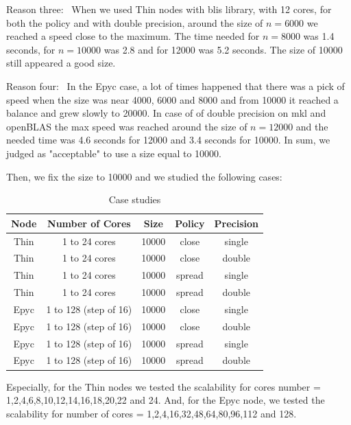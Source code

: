 \documentclass{article}
\begin{document}
Reason three: \
When we used Thin nodes with blis library, with 12 cores, for both the policy and with double precision, around the size of $ n = 6000 $ we reached a speed close to the maximum. The time needed for $ n = 8000 $ was 1.4 seconds, for $ n = 10000 $ was 2.8 and for 12000 was 5.2 seconds. The size of 10000 still appeared a good size. 

Reason four: \
In the Epyc case, a lot of times happened that there was a pick of speed when the size was near 4000, 6000 and 8000 and from 10000 it reached a balance and grew slowly to 20000. In case of of double precision on mkl and openBLAS the max speed was reached around the size of $n = 12000 $ and the needed time was 4.6 seconds for 12000 and 3.4 seconds for 10000. In sum, we judged as "acceptable" to use a size equal to 10000.

Then, we fix the size to 10000 and we studied the following cases:

\begin{table}[h]
\centering
\begin{tabular}{|c|c|c|c|c|}
\hline
\textbf{Node} & \textbf{Number of Cores} & \textbf{Size} & \textbf{Policy} & \textbf{Precision} \\
\hline
Thin & 1 to 24 cores & 10000 & close & single \\
Thin & 1 to 24 cores & 10000 & close & double \\
Thin & 1 to 24 cores & 10000 & spread & single \\
Thin & 1 to 24 cores & 10000 & spread & double \\
\hline
Epyc & 1 to 128 (step of 16) & 10000 & close & single \\
Epyc & 1 to 128 (step of 16) & 10000 & close & double \\
Epyc & 1 to 128 (step of 16) & 10000 & spread & single \\
Epyc & 1 to 128 (step of 16) & 10000 & spread & double \\
\hline
\end{tabular}
\caption{Case studies}
\label{tab:node-config}
\end{table}

Especially, for the Thin nodes we tested the scalability for cores number = 1,2,4,6,8,10,12,14,16,18,20,22 and 24. 
And, for the Epyc node, we tested the scalability for number of cores = 1,2,4,16,32,48,64,80,96,112 and 128.
\end{document}
